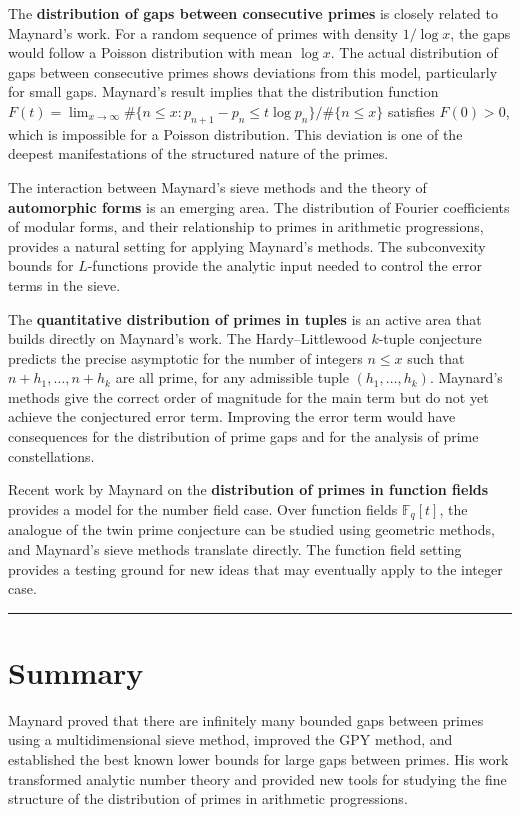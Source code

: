 The \textbf{distribution of gaps between consecutive primes} is closely related to Maynard's work. For a random sequence of primes with density $1/\log x$, the gaps would follow a Poisson distribution with mean $\log x$. The actual distribution of gaps between consecutive primes shows deviations from this model, particularly for small gaps. Maynard's result \cite{maynard2018} implies that the distribution function $F(t) = \lim_{x \to \infty} \#\{n \le x : p_{n+1} - p_n \le t \log p_n\} / \#\{n \le x\}$ satisfies $F(0) > 0$, which is impossible for a Poisson distribution. This deviation is one of the deepest manifestations of the structured nature of the primes.

The interaction between Maynard's sieve methods and the theory of \textbf{automorphic forms} is an emerging area. The distribution of Fourier coefficients of modular forms, and their relationship to primes in arithmetic progressions, provides a natural setting for applying Maynard's methods. The subconvexity bounds for $L$-functions provide the analytic input needed to control the error terms in the sieve.

The \textbf{quantitative distribution of primes in tuples} is an active area that builds directly on Maynard's work. The Hardy--Littlewood $k$-tuple conjecture predicts the precise asymptotic for the number of integers $n \le x$ such that $n + h_1, \ldots, n + h_k$ are all prime, for any admissible tuple $(h_1, \ldots, h_k)$. Maynard's methods give the correct order of magnitude for the main term but do not yet achieve the conjectured error term. Improving the error term would have consequences for the distribution of prime gaps and for the analysis of prime constellations.

Recent work by Maynard on the \textbf{distribution of primes in function fields} provides a model for the number field case. Over function fields $\mathbb{F}_q[t]$, the analogue of the twin prime conjecture can be studied using geometric methods, and Maynard's sieve methods translate directly. The function field setting provides a testing ground for new ideas that may eventually apply to the integer case.

\begin{center}\rule{0.5\linewidth}{0.5pt}\end{center}

\section*{Summary}

Maynard proved that there are infinitely many bounded gaps between primes using a multidimensional sieve method, improved the GPY method, and established the best known lower bounds for large gaps between primes. His work transformed analytic number theory and provided new tools for studying the fine structure of the distribution of primes in arithmetic progressions.
